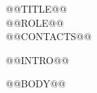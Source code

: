\documentclass[a4paper,11pt]{article}
\begin{document}
\begin{center}
  {\Huge\scshape @@TITLE@@}\\[4pt]
  {\small @@ROLE@@}\\[3pt]
  {\small @@CONTACTS@@}
\end{center}
{\small @@INTRO@@}\par
@@BODY@@
\end{document}
